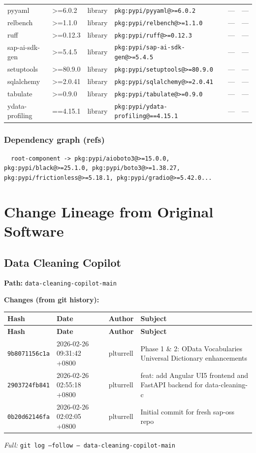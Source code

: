 \documentclass[11pt]{article}
\begin{document}
\begin{longtable}{|l|l|l|p{2.2cm}|l|p{4cm}|}
pyyaml & >=6.0.2 & library & \texttt{pkg:pypi/pyyaml@>=6.0.2} & — & — \\
relbench & >=1.1.0 & library & \texttt{pkg:pypi/relbench@>=1.1.0} & — & — \\
ruff & >=0.12.3 & library & \texttt{pkg:pypi/ruff@>=0.12.3} & — & — \\
sap-ai-sdk-gen & >=5.4.5 & library & \texttt{pkg:pypi/sap-ai-sdk-gen@>=5.4.5} & — & — \\
setuptools & >=80.9.0 & library & \texttt{pkg:pypi/setuptools@>=80.9.0} & — & — \\
sqlalchemy & >=2.0.41 & library & \texttt{pkg:pypi/sqlalchemy@>=2.0.41} & — & — \\
tabulate & >=0.9.0 & library & \texttt{pkg:pypi/tabulate@>=0.9.0} & — & — \\
ydata-profiling & ==4.15.1 & library & \texttt{pkg:pypi/ydata-profiling@==4.15.1} & — & — \\
\hline
\end{longtable}

\subsubsection*{Dependency graph (refs)}
\begin{verbatim}
  root-component -> pkg:pypi/aioboto3@>=15.0.0, pkg:pypi/black@>=25.1.0, pkg:pypi/boto3@>=1.38.27, pkg:pypi/frictionless@>=5.18.1, pkg:pypi/gradio@>=5.42.0...
\end{verbatim}

\newpage
\section{Change Lineage from Original Software}

\subsection{Data Cleaning Copilot}
\textbf{Path:} \texttt{data-cleaning-copilot-main}

\textbf{Changes (from git history):}
\begin{longtable}{|p{2.2cm}|p{3.2cm}|l|p{6cm}|}
\hline \textbf{Hash} & \textbf{Date} & \textbf{Author} & \textbf{Subject} \\ \hline \endfirsthead
\hline \textbf{Hash} & \textbf{Date} & \textbf{Author} & \textbf{Subject} \\ \hline \endhead
\texttt{9b8071156c1a} & 2026-02-26 09:31:42 +0800 & plturrell & Phase 1 \& 2: OData Vocabularies Universal Dictionary enhancements \\
\texttt{2903724fb841} & 2026-02-26 02:55:18 +0800 & plturrell & feat: add Angular UI5 frontend and FastAPI backend for data-cleaning-c \\
\texttt{0b20d62146fa} & 2026-02-26 02:02:05 +0800 & plturrell & Initial commit for fresh sap-oss repo \\
\hline
\end{longtable}
\textit{Full:} \texttt{git log --follow -- data-cleaning-copilot-main}
\end{document}
